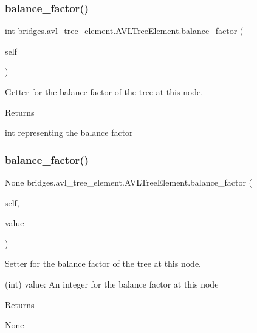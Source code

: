 \subsubsection{\texorpdfstring{balance\_factor()}{balance\_factor()}\hspace{0.1cm}{\footnotesize\ttfamily [1/2]}}
{\footnotesize\ttfamily  int bridges.\+avl\+\_\+tree\+\_\+element.\+A\+V\+L\+Tree\+Element.\+balance\+\_\+factor (\begin{DoxyParamCaption}\item[{}]{self }\end{DoxyParamCaption})}



Getter for the balance factor of the tree at this node. 

\begin{DoxyReturn}{Returns}


int representing the balance factor 
\end{DoxyReturn}
\mbox{\label{classbridges_1_1avl__tree__element_1_1_a_v_l_tree_element_aaf931b718c678cfc919e2267d1efa412}} 
\subsubsection{\texorpdfstring{balance\_factor()}{balance\_factor()}\hspace{0.1cm}{\footnotesize\ttfamily [2/2]}}
{\footnotesize\ttfamily  None bridges.\+avl\+\_\+tree\+\_\+element.\+A\+V\+L\+Tree\+Element.\+balance\+\_\+factor (\begin{DoxyParamCaption}\item[{}]{self,  }\item[{int}]{value }\end{DoxyParamCaption})}



Setter for the balance factor of the tree at this node. 

\begin{DoxyVerb}       (int) value: An integer for the balance factor at this node
\end{DoxyVerb}
 \begin{DoxyReturn}{Returns}


None 
\end{DoxyReturn}
\mbox{\label{classbridges_1_1avl__tree__element_1_1_a_v_l_tree_element_a811dd4cebd36fda6531f6cbeb873c0e5}} 
